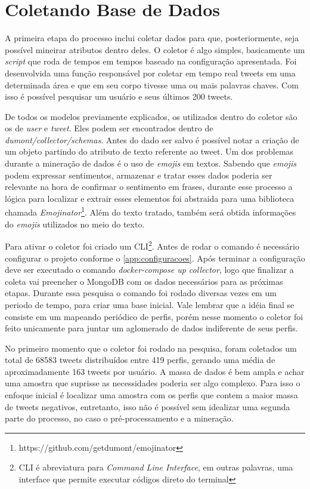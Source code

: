 \section{Coletando Base de Dados}
A primeira etapa do processo inclui coletar dados para que, posteriormente, seja possível mineirar atributos dentro deles. O coletor é algo simples, basicamente um \textit{script} que roda de tempos em tempos baseado na configuração apresentada. Foi desenvolvida uma função responsável por coletar em tempo real tweets em uma determinada área e que em seu corpo tivesse uma ou mais palavras chaves. Com isso é possível pesquisar um usuário e seus últimos 200 tweets.

De todos os modelos previamente explicados, os utilizados dentro do coletor são os de \textit{user} e \textit{tweet}. Eles podem ser encontrados dentro de \textit{dumont/collector/schemas}. Antes do dado ser salvo é possível notar a criação de um objeto partindo do atributo de texto referente ao tweet. Um dos problemas durante a mineração de dados é o uso de \textit{emojis} em textos. Sabendo que \textit{emojis} podem expressar sentimentos, armazenar e tratar esses dados poderia ser relevante na hora de confirmar o sentimento em frases, durante esse processo a lógica para localizar e extrair esses elementos foi abstraida para uma biblioteca chamada \textit{Emojinator}\footnote{https://github.com/getdumont/emojinator}. Além do texto tratado, também será obtida informações do \textit{emojis} utilizados no meio do texto.

Para ativar o coletor foi criado um CLI\footnote{CLI é abreviatura para \textit{Command Line Interface}, em outras palavras, uma interface que permite executar códigos direto do terminal}. Antes de rodar o comando é necessário configurar o projeto conforme o \autoref{app:configuracoes}. Após terminar a configuração deve ser executado o comando \textit{docker-compose up collector}, logo que finalizar a coleta vai preencher o MongoDB com os dados necessários para as próximas etapas. Durante essa pesquisa o comando foi rodado diversas vezes em um periodo de tempo, para criar uma base inicial. Vale lembrar que a idéia final se consiste em um mapeando periódico de perfis, porém nesse momento o coletor foi feito unicamente para juntar um aglomerado de dados indiferente de seus perfis.

No primeiro momento que o coletor foi rodado na pesquisa, foram coletados um total de 68583 tweets distribuídos entre 419 perfis, gerando uma média de aproximadamente 163 tweets por usuário. A massa de dados é bem ampla e achar uma amostra que suprisse as necessidades poderia ser algo complexo. Para isso o enfoque inicial é localizar uma amostra com os perfis que contem a maior massa de tweets negativos, entretanto, isso não é possível sem idealizar uma segunda parte do processo, no caso o pré-processamento e a mineração.
